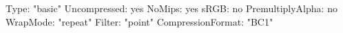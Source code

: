 Type: "basic"
Uncompressed: yes
NoMips: yes
sRGB: no
PremultiplyAlpha: no
WrapMode: "repeat"
Filter: "point"
CompressionFormat: "BC1"
